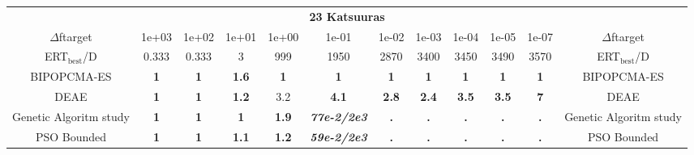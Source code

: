 \begin{tabular}{cccccccccccc}
 & \multicolumn{10}{c}{{\normalsize \textbf{23 Katsuuras}}}\\
$\Delta$ftarget& 1e+03& 1e+02& 1e+01& 1e+00& 1e-01& 1e-02& 1e-03& 1e-04& 1e-05& 1e-07 & $\Delta$ftarget \\
ERT$_{\textrm{best}}$/D& 0.333& 0.333& 3& 999& 1950& 2870& 3400& 3450& 3490& 3570 & ERT$_{\textrm{best}}$/D \\
\hline
BIPOPCMA-ES & \textbf{1} & \textbf{1} & \textbf{1.6} & \textbf{1} & \textbf{1} & \textbf{1} & \textbf{1} & \textbf{1} & \textbf{1} & \textbf{1} & BIPOPCMA-ES \cite{add_an_entry_for_BIPOPCMA-ES_in_bbob.bib}\\
DEAE & \textbf{1} & \textbf{1} & \textbf{1.2} & 3.2 & \textbf{4.1} & \textbf{2.8} & \textbf{2.4} & \textbf{3.5} & \textbf{3.5} & \textbf{7} & DEAE \cite{add_an_entry_for_DEAE_in_bbob.bib}\\
Genetic Algoritm study & \textbf{1} & \textbf{1} & \textbf{1} & \textbf{1.9} & \textbf{\textit{77e-2}\textit{/2e3}} & \textbf{.} & \textbf{.} & \textbf{.} & \textbf{.} & \textbf{.} & Genetic Algoritm study \cite{add_an_entry_for_Genetic Algoritm study_in_bbob.bib}\\
PSO Bounded & \textbf{1} & \textbf{1} & \textbf{1.1} & \textbf{1.2} & \textbf{\textit{59e-2}\textit{/2e3}} & \textbf{.} & \textbf{.} & \textbf{.} & \textbf{.} & \textbf{.} & PSO Bounded \cite{add_an_entry_for_PSO Bounded_in_bbob.bib}
\end{tabular}
